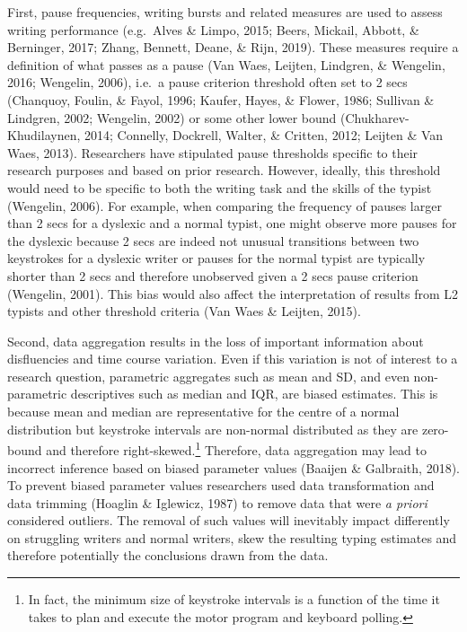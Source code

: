 \documentclass[
  english,
  man,mask,floatsintext]{apa7}
\begin{document}
First, pause frequencies, writing bursts and related measures are used to assess writing performance (e.g.~Alves \& Limpo, 2015; Beers, Mickail, Abbott, \& Berninger, 2017; Zhang, Bennett, Deane, \& Rijn, 2019). These measures require a definition of what passes as a pause (Van Waes, Leijten, Lindgren, \& Wengelin, 2016; Wengelin, 2006), i.e.~a pause criterion threshold often set to 2 secs (Chanquoy, Foulin, \& Fayol, 1996; Kaufer, Hayes, \& Flower, 1986; Sullivan \& Lindgren, 2002; Wengelin, 2002) or some other lower bound (Chukharev-Khudilaynen, 2014; Connelly, Dockrell, Walter, \& Critten, 2012; Leijten \& Van Waes, 2013). Researchers have stipulated pause thresholds specific to their research purposes and based on prior research. However, ideally, this threshold would need to be specific to both the writing task and the skills of the typist (Wengelin, 2006). For example, when comparing the frequency of pauses larger than 2 secs for a dyslexic and a normal typist, one might observe more pauses for the dyslexic because 2 secs are indeed not unusual transitions between two keystrokes for a dyslexic writer or pauses for the normal typist are typically shorter than 2 secs and therefore unobserved given a 2 secs pause criterion (Wengelin, 2001). This bias would also affect the interpretation of results from L2 typists and other threshold criteria (Van Waes \& Leijten, 2015).

Second, data aggregation results in the loss of important information about disfluencies and time course variation. Even if this variation is not of interest to a research question, parametric aggregates such as mean and SD, and even non-parametric descriptives such as median and IQR, are biased estimates. This is because mean and median are representative for the centre of a normal distribution but keystroke intervals are non-normal distributed as they are zero-bound and therefore right-skewed.\footnote{In fact, the minimum size of keystroke intervals is a function of the time it takes to plan and execute the motor program and keyboard polling.} Therefore, data aggregation may lead to incorrect inference based on biased parameter values (Baaijen \& Galbraith, 2018). To prevent biased parameter values researchers used data transformation and data trimming (Hoaglin \& Iglewicz, 1987) to remove data that were \emph{a priori} considered outliers. The removal of such values will inevitably impact differently on struggling writers and normal writers, skew the resulting typing estimates and therefore potentially the conclusions drawn from the data.
\end{document}
